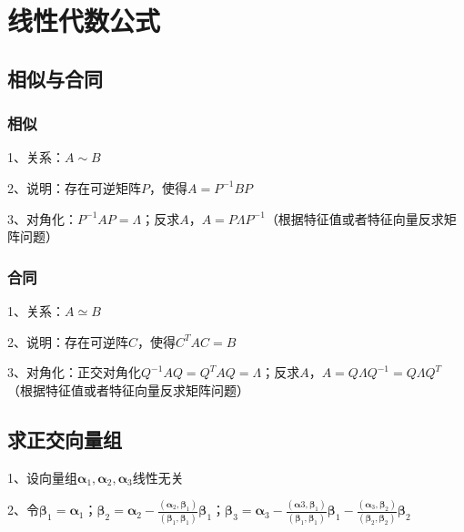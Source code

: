 \chapter{线性代数公式}

\section{相似与合同}



\subsection{相似}

1、关系：$ A \sim B $

2、说明：存在可逆矩阵$ P $，使得$ A=P^{-1}BP $

3、对角化：$ P^{-1}AP=\Lambda $；反求$ A $，$ A=P\Lambda P^{-1} $（根据特征值或者特征向量反求矩阵问题）



\subsection{合同}

1、关系：$ A \simeq B $

2、说明：存在可逆阵$ C $，使得$ C^TAC=B $

3、对角化：正交对角化$ Q^{-1}AQ=Q^TAQ=\Lambda $；反求$ A $，$ A=Q\Lambda Q^{-1}=Q\Lambda Q^{T} $（根据特征值或者特征向量反求矩阵问题）

\section{求正交向量组}

1、设向量组$ \boldsymbol{\alpha}_{1}, \boldsymbol{\alpha}_{2}, \boldsymbol{\alpha}_{3} $线性无关

2、令$ \boldsymbol{\beta}_{1}=\boldsymbol{\alpha}_{1} $；$ \boldsymbol{\beta}_{2}=\boldsymbol{\alpha}_{2}-\frac{\left(\boldsymbol{\alpha}_{2}, \boldsymbol{\beta}_{1}\right)}{\left(\boldsymbol{\beta}_{1}, \boldsymbol{\beta}_{1}\right)} \boldsymbol{\beta}_{1} $；$ \boldsymbol{\beta}_{3}=\boldsymbol{\alpha}_{3}-\frac{\left(\boldsymbol{\alpha}{3}, \boldsymbol{\beta}_{1}\right)}{\left(\boldsymbol{\beta}_{1}, \boldsymbol{\beta}_{1}\right)} \boldsymbol{\beta}_{1}-\frac{\left(\boldsymbol{\alpha}_{3}, \boldsymbol{\beta}_{2}\right)}{\left(\boldsymbol{\beta}_{2}, \boldsymbol{\beta}_{2}\right)} \boldsymbol{\beta}_{2} $

